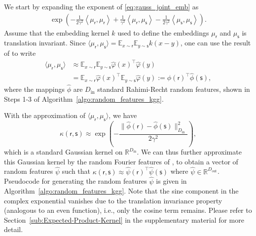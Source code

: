 \documentclass[english]{article}
\theoremstyle{plain}
\theoremstyle{plain}
\newcommand{\secref}[1]{Section~\ref{#1}}
\begin{document}
We start by expanding the  exponent 
of \eqref{eq:gauss_joint_emb} as
%
\begin{align*}
  \exp\left(-\frac{1}{2\gamma^{2}}\left\langle \mu_{\mathsf{r}},\mu_{\mathsf{r}}\right\rangle +\frac{1}{\gamma^{2}}\left\langle \mu_{\mathsf{r}},\mu_{\mathsf{s}}\right\rangle -\frac{1}{2\gamma^{2}}\left\langle \mu_{\mathsf{s}},\mu_{\mathsf{s}}\right\rangle \right).
\end{align*}
%
Assume that the embedding kernel $k$ used to define the embeddings $\mu_\mathsf{r}$ 
and $\mu_\mathsf{s}$ is translation invariant. Since 
$\langle \mu_{\mathsf{r}},\mu_{\mathsf{s}}  \rangle
= \mathbb{E}_{x \sim \mathsf{r}} \mathbb{E}_{y \sim \mathsf{s}} k(x-y)$, one can use 
the result of \cite{Rahimi2007} to write
%
\begin{align*}
 \langle \mu_{\mathsf{r}},\mu_{\mathsf{s}}  \rangle
 & \approx \mathbb{E}_{x \sim \mathsf{r}} \mathbb{E}_{y \sim \mathsf{s}} 
   \hat{\varphi}(x)^\top \hat{\varphi}(y) \nonumber \\ 
 & = \mathbb{E}_{x \sim \mathsf{r}} 
   \hat{\varphi}(x)^\top \mathbb{E}_{y \sim \mathsf{s}}  \hat{\varphi}(y) 
 := \hat{\phi}(\mathsf{r})^\top \hat{\phi}(\mathsf{s}),
\end{align*}
%
where the mappings $\hat{\phi}$ are $D_\mathrm{in}$ standard Rahimi-Recht random features, shown in Steps 1-3 of Algorithm~\ref{algo:random_features_kgg}.

With the approximation of $\langle \mu_{\mathsf{r}},\mu_{\mathsf{s}}  \rangle$,
we have
\begin{equation}
\kappa(\mathsf{r}, \mathsf{s})\approx\exp\left(-\frac{\|\hat{\phi}(\mathsf{r})-\hat{\phi}(\mathsf{s})\|_{D_\mathrm{in}}^{2}}{2\gamma^{2}}\right),
%
\end{equation}
which is a standard Gaussian kernel on $\mathbb{R}^{D_\mathrm{in}}$.
We can thus further approximate this Gaussian kernel 
%
%
by the random Fourier features of \citeauthor{Rahimi2007}, to obtain a vector 
of random features $\hat{\psi}$ such that 
$\kappa(\mathsf{r}, \mathsf{s}) \approx \hat{\psi}(\mathsf{r})^\top \hat{\psi}(\mathsf{s})$
where $\hat{\psi} \in \mathbb{R}^{D_\mathrm{out}}$. 
Pseudocode for generating the random features $\hat{\psi}$ is given in
Algorithm~\ref{algo:random_features_kgg}. 
Note that the sine component in the complex exponential vanishes due to the
translation invariance property (analogous to an even function), i.e.,  only 
the cosine term remains.
Please refer to \secref{sub:Expected-Product-Kernel} in the supplementary material for more detail.
\end{document}
